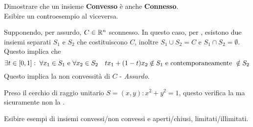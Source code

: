 \begin{exercise}
	Dimostrare che un insieme \textbf{Convesso} è anche \textbf{Connesso}.\\
	Esibire un controesempio al viceversa.
	\begin{solution}
		Supponendo, per assurdo, $C \in \mathbb{R}^n$ sconnesso. In questo caso, per , esistono due insiemi separati $S_1$ e $S_2$ che costituiscono $C$, inoltre $S_1 \cup S_2 = C$ e $S_1 \cap S_2 = \emptyset$. Questo implica che
		\[\exists t \in \left[0,1\right]:\; \forall x_1 \in S_1 \text{ e } \forall x_2 \in S_2 \quad tx_1 + (1-t)x_2 \notin S_1 \text{ e contemporaneamente } \notin S_2\]
		Questo implica la non convessità di $C$ - \textit{Assurdo}.
	\end{solution}
	\begin{solution}
		Preso il cerchio di raggio unitario $S = {(x,y): x^2 + y^2 = 1}$, questo verifica la  ma sicuramente non la \fullref{def:convesso}.
	\end{solution}
\end{exercise}
\begin{exercise}
	Esibire esempi di insiemi convessi/non convessi e aperti/chiusi, limitati/illimitati.
\end{exercise}


